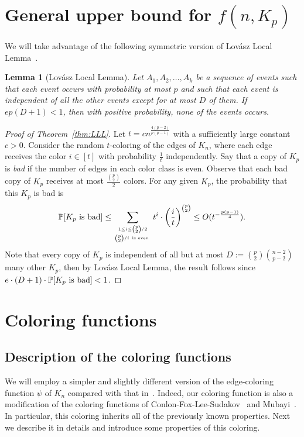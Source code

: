 \documentclass[11pt]{article}
\newtheorem{lemma}[theorem]{Lemma}
\theoremstyle{definition}
\begin{document}
\section{General upper bound for $f(n,K_{p})$}\label{sec:LLL}
We will take advantage of the following symmetric version of Lov\'{a}sz Local Lemma~\cite{2016AlonProb}.

\begin{lemma}[Lov\'{a}sz Local Lemma]
    Let $A_{1},A_{2},\ldots,A_{k}$ be a sequence of events such that each event occurs with probability at most $p$ and such that each event is independent of all the other events except for at most $D$ of them. If $ep(D+1)<1$, then with positive probability, none of the events occurs.
\end{lemma}

\begin{proof}[Proof of Theorem~\ref{thm:LLL}]

Let $t=cn^{\frac{4(p-2)}{p(p-1)}}$ with a sufficiently large constant $c>0$. Consider the random $t$-coloring of the edges of $K_{n}$, where each edge receives the color $i\in [t]$ with probability $\frac{1}{t}$ independently. Say that a copy of $K_{p}$ is \emph{bad} if the number of edges in each color class is even. Observe that each bad copy of $K_{p}$ receives at most $\frac{\binom{p}{2}}{2}$ colors. For any given $K_{p}$, the probability that this $K_{p}$ is bad is
\begin{equation*}
  \mathbb{P}[K_{p}\ \textup{is\ bad}] \le \sum\limits_{1\le i\le\binom{p}{2}/2\atop \binom{p}{2}/i\ \textup{is\ even }} t^{i}\cdot\bigg(\frac{i}{t}\bigg)^{\binom{p}{2}}\le O(t^{-\frac{p(p-1)}{4}}).
\end{equation*}
Note that every copy of $K_{p}$ is independent of all but at most $D:=\binom{p}{2}\binom{n-2}{p-2}$ many other $K_{p}$, then by Lov\'{a}sz Local Lemma, the result follows since $e\cdot(D+1)\cdot\mathbb{P}[K_{p}\ \textup{is\ bad}]<1$.

\end{proof}


\section{Coloring functions}\label{sec:ColoringFunction}
\subsection{Description of the coloring functions}

 We will employ a simpler and slightly different version of the edge-coloring function $\psi$ of $K_{n}$ compared with that in~\cite{2023CPC6688}. Indeed, our coloring function is also a modification of the coloring functions of Conlon-Fox-Lee-Sudakov~\cite{2015PLMSCFLS} and Mubayi~\cite{1998Mubayi43}. In particular, this coloring inherits all of the previously known properties. Next we describe it in details and introduce some properties of this coloring.
\end{document}
